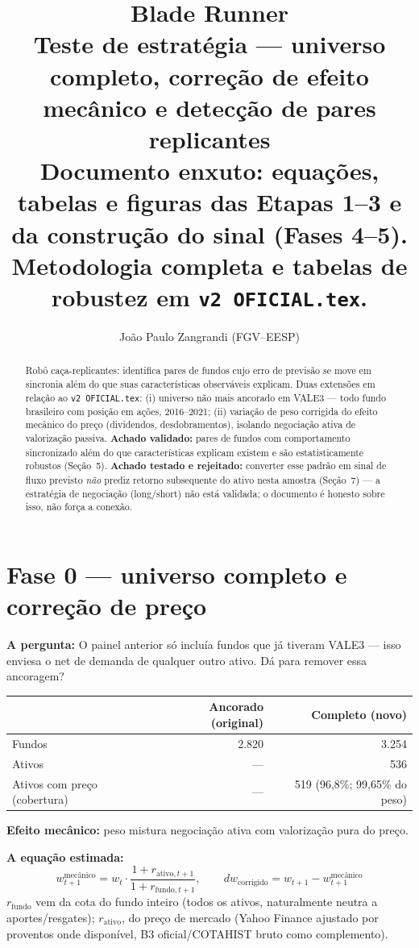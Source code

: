 \documentclass[11pt,a4paper]{article}
\title{\textbf{Blade Runner}\\[8pt]
\Large Teste de estratégia --- universo completo, correção de efeito mecânico e detecção de pares replicantes\\[4pt]
\normalsize Documento enxuto: equações, tabelas e figuras das Etapas 1--3 e da construção do
sinal (Fases 4--5). Metodologia completa e tabelas de robustez em \texttt{v2 OFICIAL.tex}.}
\author{João Paulo Zangrandi (FGV--EESP)}
\date{}
\newcommand{\pergunta}[1]{\par\vspace{4pt}\noindent\textbf{\color{azul}A pergunta:} #1\par\vspace{2pt}}
\newcommand{\equacao}[0]{\par\vspace{4pt}\noindent\textbf{\color{vermelho}A equação estimada:}\ }
\begin{document}
\maketitle

\begin{abstract}
\noindent Robô caça-replicantes: identifica pares de fundos cujo erro de previsão se move em
sincronia além do que suas características observáveis explicam. Duas extensões em relação
ao \texttt{v2 OFICIAL.tex}: (i) universo não mais ancorado em VALE3 --- todo fundo brasileiro
com posição em ações, 2016--2021; (ii) variação de peso corrigida do efeito mecânico do preço
(dividendos, desdobramentos), isolando negociação ativa de valorização passiva. \textbf{Achado
validado:} pares de fundos com comportamento sincronizado além do que características
explicam existem e são estatisticamente robustos (Seção~5). \textbf{Achado testado e
rejeitado:} converter esse padrão em sinal de fluxo previsto \emph{não} prediz retorno
subsequente do ativo nesta amostra (Seção~7) --- a estratégia de negociação (long/short) não
está validada; o documento é honesto sobre isso, não força a conexão.
\end{abstract}

\tableofcontents

\section{Fase 0 --- universo completo e correção de preço}

\pergunta{O painel anterior só incluía fundos que já tiveram VALE3 --- isso enviesa o net de
demanda de qualquer outro ativo. Dá para remover essa ancoragem?}

\begin{center}\small
\begin{tabular}{lrr}
\toprule
 & \textbf{Ancorado (original)} & \textbf{Completo (novo)} \\
\midrule
Fundos & 2.820 & 3.254 \\
Ativos & --- & 536 \\
Ativos com preço (cobertura) & --- & 519 (96,8\%; 99,65\% do peso) \\
\bottomrule
\end{tabular}
\end{center}

\textbf{Efeito mecânico:} peso mistura negociação ativa com valorização pura do preço.
\equacao
$$w^{\text{mecânico}}_{t+1} = w_t \cdot \frac{1+r_{\text{ativo},t+1}}{1+r_{\text{fundo},t+1}},
\qquad dw_{\text{corrigido}} = w_{t+1} - w^{\text{mecânico}}_{t+1}$$
$r_{\text{fundo}}$ vem da cota do fundo inteiro (todos os ativos, naturalmente neutra a
aportes/resgates); $r_{\text{ativo}}$, do preço de mercado (Yahoo Finance ajustado por
proventos onde disponível, B3 oficial/COTAHIST bruto como complemento).
\end{document}
